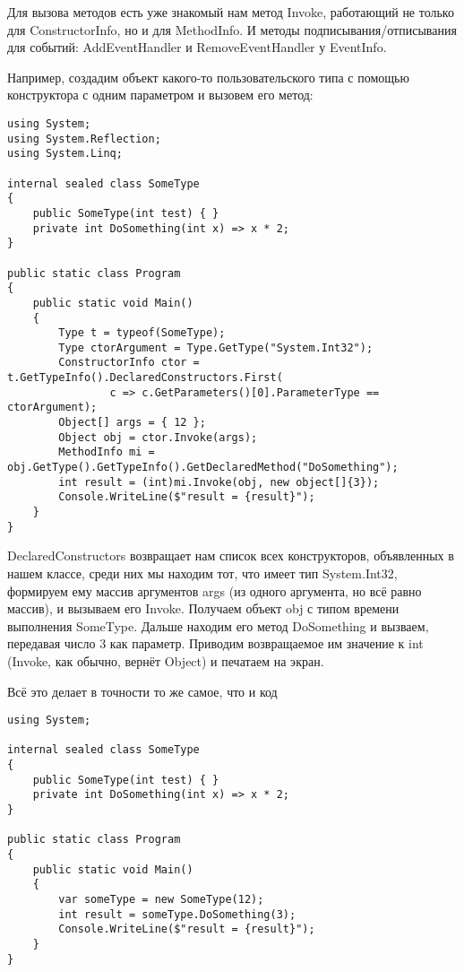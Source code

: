 \documentclass[a5paper]{article}
\begin{document}
Для вызова методов есть уже знакомый нам метод Invoke, работающий не только для ConstructorInfo, но и для MethodInfo. И методы подписывания/отписывания для событий: AddEventHandler и RemoveEventHandler у EventInfo.

Например, создадим объект какого-то пользовательского типа с помощью конструктора с одним параметром и вызовем его метод:

\begin{verbatim}
using System;
using System.Reflection;
using System.Linq;

internal sealed class SomeType 
{
    public SomeType(int test) { }
    private int DoSomething(int x) => x * 2;
}

public static class Program 
{
    public static void Main() 
    {
        Type t = typeof(SomeType);
        Type ctorArgument = Type.GetType("System.Int32");
        ConstructorInfo ctor = t.GetTypeInfo().DeclaredConstructors.First(
                c => c.GetParameters()[0].ParameterType == ctorArgument);
        Object[] args = { 12 };
        Object obj = ctor.Invoke(args);
        MethodInfo mi = obj.GetType().GetTypeInfo().GetDeclaredMethod("DoSomething");
        int result = (int)mi.Invoke(obj, new object[]{3});
        Console.WriteLine($"result = {result}");
    }
}
\end{verbatim}

DeclaredConstructors возвращает нам список всех конструкторов, объявленных в нашем классе, среди них мы находим тот, что имеет тип System.Int32, формируем ему массив аргументов args (из одного аргумента, но всё равно массив), и вызываем его Invoke. Получаем объект obj с типом времени выполнения SomeType. Дальше находим его метод DoSomething и вызваем, передавая число 3 как параметр. Приводим возвращаемое им значение к int (Invoke, как обычно, вернёт Object) и печатаем на экран.

Всё это делает в точности то же самое, что и код

\begin{verbatim}
using System;

internal sealed class SomeType 
{
    public SomeType(int test) { }
    private int DoSomething(int x) => x * 2;
}

public static class Program 
{
    public static void Main() 
    {
        var someType = new SomeType(12);
        int result = someType.DoSomething(3);
        Console.WriteLine($"result = {result}");
    }
}
\end{verbatim}
\end{document}
